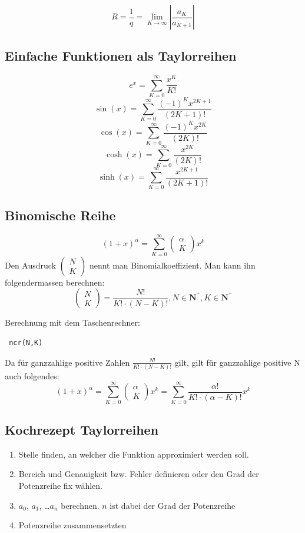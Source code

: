 \[ \boxed{R = \frac{1}{q} = \lim_{K \rightarrow \infty} \left| \frac{a_K}{a_{K + 1}} \right|} \]

\subsection{Einfache Funktionen als Taylorreihen}
\[ \boxed{e^x = \sum_{K=0}^{\infty} \frac{x^K}{K!}} \]
\[ \boxed{\sin(x) = \sum_{K=0}^{\infty} \frac{(-1)^K x^{2K+1}}{(2K+1)!}} \]
\[ \boxed{\cos(x) = \sum_{K=0}^{\infty} \frac{(-1)^K x^{2K}}{(2K)!}} \]
\[ \boxed{\cosh(x) = \sum_{K=0}^{\infty} \frac{x^{2K}}{(2K)!}} \]
\[ \boxed{\sinh(x) = \sum_{K=0}^{\infty} \frac{x^{2K+1}}{(2K+1)!}} \]

\subsection{Binomische Reihe}
\[ \boxed{(1 + x)^\alpha = \sum_{K=0}^{\infty}\left(\begin{matrix}\alpha\\K\end{matrix}\right)x^k } \]
Den Ausdruck \( \left(\begin{matrix}N\\K\end{matrix}\right) \) nennt man Binomialkoeffizient. Man kann ihn folgendermassen berechnen:
\[ \boxed{\left(\begin{matrix}N\\K\end{matrix}\right) = \frac{N !}{K! \cdot (N - K)!}, N \in \mathbf{N}^{{}^{\ensuremath{\!+\!}}}_{}, K \in \mathbf{N}^{{}^{\ensuremath{\!+\!}}}_{} } \]

\iftiboth
Berechnung mit dem Taschenrechner:
\begin{verbatim} ncr(N,K) \end{verbatim}
\fi

\noindent
Da für ganzzahlige positive Zahlen \( \frac{N !}{K! \cdot (N - K)!} \) gilt, gilt für ganzzahlige positive N auch folgendes:
\[ \boxed{(1 + x)^\alpha = \sum_{K=0}^{\infty}\left(\begin{matrix}\alpha\\K\end{matrix}\right)x^k = \sum_{K=0}^{\infty}\frac{\alpha !}{K! \cdot (\alpha - K)!}x^k} \]

\subsection{Kochrezept Taylorreihen}
\begin{enumerate}
  \item Stelle finden, an welcher die Funktion approximiert werden soll. 
  \item Bereich und Genauigkeit bzw. Fehler definieren oder den Grad der Potenzreihe fix wählen. 
  \item $a_0$, $a_1$, \dots $a_n$ berechnen. $n$ ist dabei der Grad der Potenzreihe
  \item Potenzreihe zusammensetzten
\end{enumerate}

